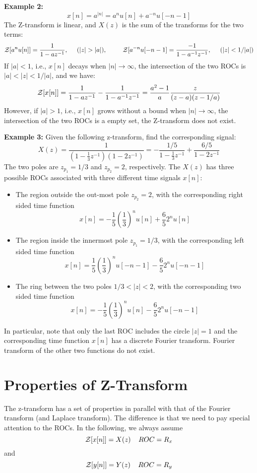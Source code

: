 {\bf Example 2:} 
\[ x[n]=a^{|n|}=a^n u[n]+a^{-n} u[-n-1] \]
The Z-transform is linear, and $X(z)$ is the sum of the transforms for the two terms:
\[ {\cal Z}[a^n u[n]]=\frac{1}{1-az^{-1}},\;\;\;\;\;(|z|>|a|),\;\;\;\;\;\;\;\;\;
   {\cal Z}[a^{-n}u[-n-1]=\frac{-1}{1-a^{-1}z^{-1}},\;\;\;\;\;(|z|<1/|a|) \]
If $|a|<1$, i.e., $x[n]$ decays when $|n|\rightarrow\infty$, the intersection of
the two ROCs is $|a|<|z|<1/|a|$, and we have:
\[ {\cal Z}[x[n]]=\frac{1}{1-az^{-1}}-\frac{1}{1-a^{-1}z^{-1}}
=\frac{a^2-1}{a}\frac{z}{(z-a)(z-1/a)} \]
However, if $|a|>1$, i.e., $x[n]$ grows without a bound when $|n|\rightarrow\infty$,
the intersection of the two ROCs is a empty set, the Z-transform does not exist.

{\bf Example 3: } Given the following z-transform, find the corresponding signal:
\[ X(z)=\frac{1}{(1-\frac{1}{3}z^{-1})(1-2z^{-1})}
	=-\frac{1/5}{1-\frac{1}{3}z^{-1}}+\frac{6/5}{1-2z^{-1}} \]
The two poles are $z_{p_1}=1/3$ and $z_{p_2}=2$, respectively. The $X(z)$ has 
three possible ROCs associated with three different time signals $x[n]$:
\begin{itemize}
\item The region outside the out-most pole $z_{p_2}=2$, with the corresponding 
	right sided time function
\[ x[n]=-\frac{1}{5}(\frac{1}{3})^n u[n]+\frac{6}{5}2^n u[n]	\]
\item The region inside the innermost pole $z_{p_1}=1/3$, with the corresponding 
	left sided time function
\[ x[n]=\frac{1}{5}(\frac{1}{3})^n u[-n-1]-\frac{6}{5}2^n u[-n-1]	\]
\item The ring between the two poles $1/3 < |z| < 2$, with the corresponding two 
	sided time function
\[ x[n]=-\frac{1}{5}(\frac{1}{3})^n u[n]-\frac{6}{5}2^n u[-n-1]	\]
\end{itemize}
In particular, note that only the last ROC includes the circle $|z|=1$ and the 
corresponding time function $x[n]$ has a discrete Fourier transform. Fourier 
transform of the other two functions do not exist.

\newpage
\section*{Properties of Z-Transform}

The z-transform has a set of properties in parallel with that of the Fourier 
transform (and Laplace transform). The difference is that we need to pay 
special attention to the ROCs. In the following, we always assume
\[	{\cal Z}[x[n]]=X(z)\;\;\;\;ROC=R_x	\]
and
\[	{\cal Z}[y[n]]=Y(z)\;\;\;\;ROC=R_y	\]

